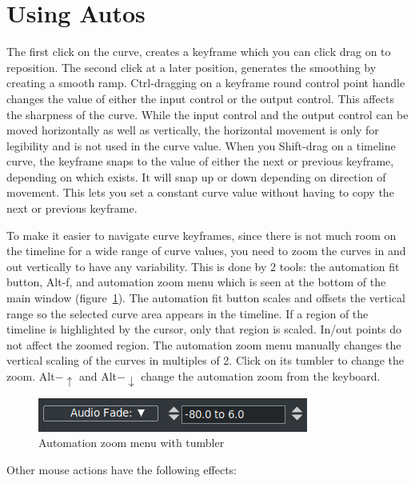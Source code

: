 \section{Using Autos}%
\label{sec:using_autos}

The first click on the curve, creates a keyframe which you can click drag on to reposition.  The second click at a later position, generates the smoothing by creating a smooth ramp.  Ctrl-dragging on a keyframe round control point handle changes the value of either the input control or the output control.  This affects the sharpness of the curve.  While the input control and the output control can be moved horizontally as well as vertically, the horizontal movement is only for legibility and is not used in the curve value.  When you Shift-drag on a timeline curve, the keyframe snaps to the value of either the next or previous keyframe, depending on which exists.  It will snap up or down depending on direction of movement.  This lets you set a constant curve value without having to copy the next or previous keyframe.

To make it easier to navigate curve keyframes, since there is not much room on the timeline for a wide range of curve values, you need to zoom the curves in and out vertically to have any variability.  This is done by 2 tools: the automation fit button, Alt-f, and automation zoom menu which is seen at the bottom of the main window (figure~\ref{fig:automation}). The automation fit button scales and offsets the vertical range so the selected curve area appears in the timeline.  If a region of the timeline is highlighted by the cursor, only that region is scaled.  In/out points do not affect the zoomed region.  The automation zoom menu manually changes the vertical scaling of the curves in multiples of 2.  Click on its tumbler to change the zoom.  Alt$-\uparrow$ and Alt$-\downarrow$ change the automation zoom from the keyboard.

\begin{figure}[htpb]
    \centering
    \includegraphics[width=0.7\linewidth]{images/automation.png}
    \caption{Automation zoom menu with tumbler}
    \label{fig:automation}
\end{figure}

\noindent Other mouse actions have the following effects:

